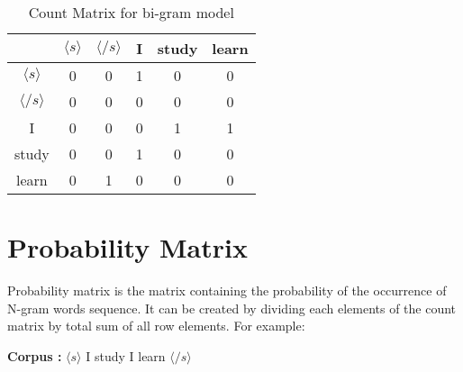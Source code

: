 \begin{table}[h]
	\centering
	\begin{tabular}{|c| c| c| c| c| c|}
		\hline
		                     & $\langle s \rangle$ & $\langle /s \rangle$ & I & study & learn \\
		\hline
		$\langle s \rangle$  & 0                   & 0                    & 1 & 0     & 0     \\
		\hline
		$\langle /s \rangle$ & 0                   & 0                    & 0 & 0     & 0     \\
		\hline
		I                    & 0                   & 0                    & 0 & 1     & 1     \\
		\hline
		study                & 0                   & 0                    & 1 & 0     & 0     \\
		\hline
		learn                & 0                   & 1                    & 0 & 0     & 0     \\
		\hline
	\end{tabular}
	\caption{Count Matrix for bi-gram model}
	\label{tab:cmbi2}
\end{table}

\section{Probability Matrix}
Probability matrix is the matrix containing the probability of the occurrence of N-gram words sequence. It can be created by dividing each elements of the count matrix by total sum of all row elements. For example:

\textbf{Corpus : } $\langle s \rangle$ I study I learn $\langle /s \rangle$

